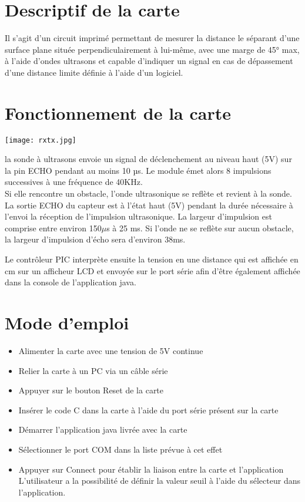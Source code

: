 \documentclass[a4paper]{article}
\begin{document}
\section{Descriptif de la carte}
Il s’agit d’un circuit imprimé permettant de mesurer la distance le séparant d’une surface plane située perpendiculairement à lui-même, avec une marge de 45° max, à l’aide d’ondes ultrasons et capable d’indiquer un signal en cas de dépassement d’une distance limite définie à l’aide d’un logiciel.

\section{Fonctionnement de la carte}
\begin{center}
\texttt{[image: rxtx.jpg]} \\
\end{center}
la sonde à ultrasons envoie un signal de déclenchement au niveau haut (5V) sur la pin ECHO pendant au moins 10 µs. Le module émet alors 8 impulsions successives à une fréquence de 40KHz.\\
Si elle rencontre un obstacle, l’onde ultrasonique se reflète et revient à la sonde.\\
La sortie ECHO du capteur est à l'état haut (5V) pendant la durée nécessaire à l’envoi la réception de l’impulsion ultrasonique. La largeur d'impulsion est comprise entre environ 150$\mu$s à 25 ms. Si l’onde ne se reflète sur aucun obstacle, la largeur d'impulsion d'écho sera d'environ 38ms.

Le contrôleur PIC interprète ensuite la tension en une distance qui est affichée en cm sur un afficheur LCD et envoyée sur le port série afin d'être également affichée dans la console de l’application java.
\section{Mode d’emploi}
\begin{itemize}
\item Alimenter la carte avec une tension de 5V continue
\item Relier la carte à un PC via un câble série
\item Appuyer sur le bouton Reset de la carte
\item Insérer le code C dans la carte à l’aide du port série présent sur la carte
\item Démarrer l’application java livrée avec la carte
\item Sélectionner le port COM dans la liste prévue à cet effet
\item Appuyer sur Connect pour établir la liaison entre la carte et l’application
L’utilisateur a la possibilité de définir la valeur seuil à l’aide du sélecteur dans l’application.


\end{itemize}
\end{document}
